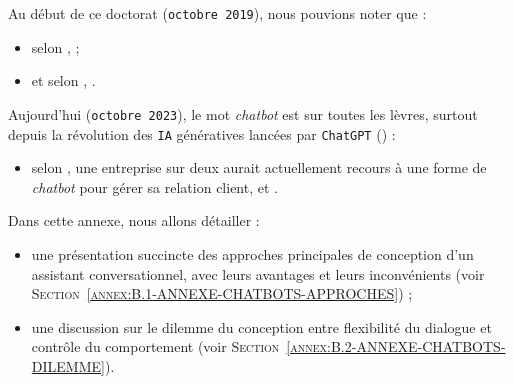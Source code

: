 \DontFrameThisInToc
{}
\label{annex:B-ANNEXE-CHATBOTS}
	
	
	Au début de ce doctorat (\texttt{octobre 2019}), nous pouvions noter que :
	\begin{itemize}
		\item selon \cite{costello-lodolce:2019:gartner-top-technologies},  ;
		\item et selon \cite{goasduff:2019:chatbots-will-appeal}, .
	\end{itemize}
	
	Aujourd'hui (\texttt{octobre 2023}), le mot \textit{chatbot} est sur toutes les lèvres, surtout depuis la révolution des \texttt{IA} génératives lancées par \texttt{ChatGPT} (\cite{openai:2023:chatgpt}) :
	\begin{itemize}
		\item selon \cite{costello-lodolce:2022:gartner-predicts-chatbots}, une entreprise sur deux aurait actuellement recours à une forme de \textit{chatbot} pour gérer sa relation client, et .
	\end{itemize}

	Dans cette annexe, nous allons détailler :
	\begin{itemize}
		\item une présentation succincte des approches principales de conception d'un assistant conversationnel, avec leurs avantages et leurs inconvénients (voir \textsc{Section~\ref{annex:B.1-ANNEXE-CHATBOTS-APPROCHES}}) ;
		\item une discussion sur le dilemme du conception entre flexibilité du dialogue et contrôle du comportement (voir \textsc{Section~\ref{annex:B.2-ANNEXE-CHATBOTS-DILEMME}}).
	\end{itemize}
	
	\minitoc

